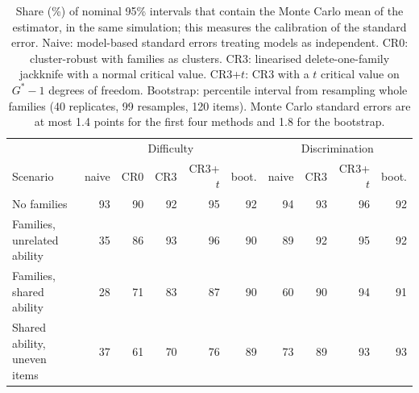 \begin{table}[!htb]\centering\footnotesize\setlength{\tabcolsep}{3.5pt}
\caption{Share (\%) of nominal 95\% intervals that contain the Monte Carlo mean of the estimator, in the same simulation; this measures the calibration of the standard error. Naive: model-based standard errors treating models as independent. CR0: cluster-robust with families as clusters. CR3: linearised delete-one-family jackknife with a normal critical value. CR3+$t$: CR3 with a $t$ critical value on $G^\ast-1$ degrees of freedom. Bootstrap: percentile interval from resampling whole families (40 replicates, 99 resamples, 120 items). Monte Carlo standard errors are at most 1.4 points for the first four methods and 1.8 for the bootstrap.}\label{tab:simcover}
\begin{tabular}{l|rrrrr|rrrr}
\toprule
 & \multicolumn{5}{c|}{Difficulty} & \multicolumn{4}{c}{Discrimination}\\
Scenario & naive & CR0 & CR3 & CR3+$t$ & boot. & naive & CR3 & CR3+$t$ & boot.\\
\midrule
No families & 93 & 90 & 92 & 95 & 92 & 94 & 93 & 96 & 92\\
Families, unrelated ability & 35 & 86 & 93 & 96 & 90 & 89 & 92 & 95 & 92\\
Families, shared ability & 28 & 71 & 83 & 87 & 90 & 60 & 90 & 94 & 91\\
Shared ability, uneven items & 37 & 61 & 70 & 76 & 89 & 73 & 89 & 93 & 93\\
\bottomrule
\end{tabular}
\end{table}
